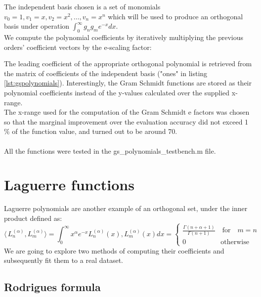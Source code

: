 \documentclass[a4paper]{article}
\numberwithin{equation}{section}
\begin{document}
The independent basis chosen is a set of monomials $v_0 = 1, v_1 = x, v_2 = x^2, \ldots, v_n=x^n$ which will be used to produce an orthogonal basis under operation $\int_{0}^{\infty} g_n g_m e^{-x} dx$.\\
We compute the polynomial coefficients by iteratively multiplying the previous orders' coefficient vectors by the e-scaling factor:



\noindent The leading coefficient of the appropriate orthogonal polynomial is retrieved from the matrix of coefficients of the independent basis ("ones" in listing \ref{lst:gspolynomials}). Interestingly, the Gram Schmidt functions are stored as their polynomial coefficients instead of the y-values calculated over the supplied x-range. \\
The x-range used for the computation of the Gram Schmidt e factors was chosen so that the marginal improvement over the evaluation accuracy did not exceed 1 \% of the function value, and turned out to be around 70. \\ \\
All the functions were tested in the gs\_polynomials\_testbench.m file.

\section{Laguerre functions}

Laguerre polynomials are another example of an orthogonal set, under the inner product defined as:
\begin{equation} \label{laguerre_inner_product}
\langle\,L_n^{(\alpha)}, L_m^{(\alpha)}\rangle=\int_{0}^{\infty} x^{\alpha} e^{-x} L_n^{(\alpha)}(x), L_m^{(\alpha)}(x)dx = 
\begin{cases} 
      \frac{\Gamma(n+\alpha+1)}{\Gamma(n+1)} \quad \textrm{for} \quad m = n \\
      0 \quad \quad \quad \quad \quad \textrm{otherwise}
\end{cases}
\end{equation}
We are going to explore two methods of computing their coefficients and subsequently fit them to a real dataset.

\subsection{Rodrigues formula}
\end{document}
